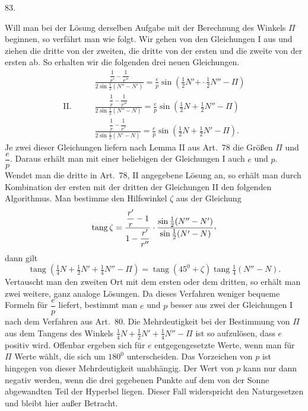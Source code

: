 \par{}\medskip
\hypertarget{native-112-article083}{}
\begin{center}83.\end{center}
Will man bei der Lösung derselben Aufgabe mit der Berechnung des Winkels $\Pi$ beginnen, so verfährt man wie folgt. Wir gehen von den Gleichungen I aus und ziehen die dritte von der zweiten, die dritte von der ersten und die zweite von der ersten ab. So erhalten wir die folgenden drei neuen Gleichungen.
\[
\begin{aligned}
&\frac{\dfrac1{r'}-\dfrac1{r''}}{2\sin\tfrac12(N''-N')}=\frac{e}{p}\sin(\tfrac12N'+\mathpunct{\cdot}\tfrac12N''-\Pi)\\[6pt]
\mathrm{II.}\qquad&\frac{\dfrac1r-\dfrac1{r''}}{2\sin\tfrac12(N''-N)}=\frac{e}{p}\sin(\tfrac12N+\tfrac12N''-\Pi)\\[6pt]
&\frac{\dfrac1r-\dfrac1{r'}}{2\sin\tfrac12(N'-N)}=\frac{e}{p}\sin(\tfrac12N+\tfrac12N'-\Pi).
\end{aligned}
\]
Je zwei dieser Gleichungen liefern nach Lemma II aus Art.\ 78 die Größen $\Pi$ und $\dfrac{e}{p}$. Daraus erhält man mit einer beliebigen der Gleichungen I auch $e$ und $p$. Wendet man die dritte in Art.\ 78, II angegebene Lösung an, so erhält man durch Kombination der ersten mit der dritten der Gleichungen II den folgenden Algorithmus. Man bestimme den Hilfswinkel $\zeta$ aus der Gleichung
\[
\operatorname{tang}\zeta=\frac{\dfrac{r'}r-1}{1-\dfrac{r'}{r''}}\cdot\frac{\sin\tfrac12(N''-N')}{\sin\tfrac12(N'-N)}\mathpunct{\raisebox{.45ex}{,}}
\]
dann gilt
\[
\operatorname{tang}(\tfrac14N+\tfrac12N'+\tfrac14N''-\Pi)=\operatorname{tang}(45^0+\zeta)\operatorname{tang}\tfrac14(N''-N).
\]
Vertauscht man den zweiten Ort mit dem ersten oder dem dritten, so erhält man zwei weitere, ganz analoge Lösungen. Da dieses Verfahren weniger bequeme Formeln für $\dfrac{e}{p}$ liefert, bestimmt man $e$ und $p$ besser aus zwei der Gleichungen I nach dem Verfahren aus Art.\ 80. Die Mehrdeutigkeit bei der Bestimmung von $\Pi$ aus dem Tangens des Winkels $\tfrac14N+\tfrac12N'+\tfrac14N''-\Pi$ ist so aufzulösen, dass $e$ positiv wird. Offenbar ergeben sich für $e$ entgegengesetzte Werte, wenn man für $\Pi$ Werte wählt, die sich um $180^0$ unterscheiden. Das Vorzeichen von $p$ ist hingegen von dieser Mehrdeutigkeit unabhängig. Der Wert von $p$ kann nur dann negativ werden, wenn die drei gegebenen Punkte auf dem von der Sonne abgewandten Teil der Hyperbel liegen. Dieser Fall widerspricht den Naturgesetzen und bleibt hier außer Betracht.

